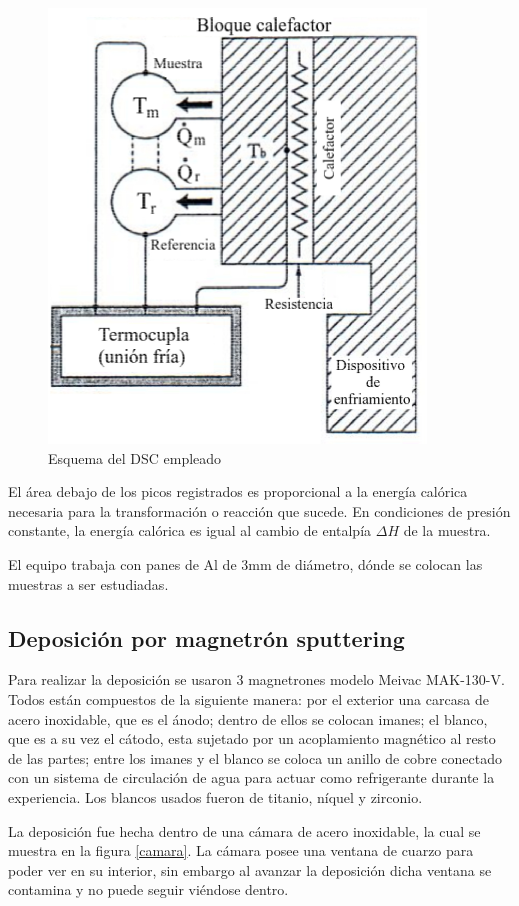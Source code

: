 \documentclass{article}
\theoremstyle{definition}
\theoremstyle{remark}
\begin{document}
\begin{figure}[h]
	\centering
	\includegraphics[scale=0.2]{img/DSCscheme.png}
	\caption{Esquema del DSC empleado}
	\label{DSCscheme}
\end{figure}

El área debajo de los picos registrados es proporcional a la energía calórica necesaria para la transformación o reacción que sucede. En condiciones de presión constante, la energía calórica es igual al cambio de entalpía $\Delta H$ de la muestra.

El equipo trabaja con panes de Al de 3mm de diámetro, dónde se colocan las muestras a ser estudiadas.

\subsection{Deposición por magnetrón sputtering}
Para realizar la deposición se usaron 3 magnetrones modelo Meivac MAK-130-V. Todos están compuestos de la siguiente manera: por el exterior una carcasa de acero inoxidable, que es el ánodo; dentro de ellos se colocan imanes; el blanco, que es a su vez el cátodo, esta sujetado por un acoplamiento magnético al resto de las partes; entre los imanes y el blanco se coloca un anillo de cobre conectado con un sistema de circulación de agua para actuar como refrigerante durante la experiencia. Los blancos usados fueron de titanio, níquel y zirconio.

La deposición fue hecha dentro de una cámara de acero inoxidable, la cual se muestra en la figura \ref{camara}. La cámara posee una ventana de cuarzo para poder ver en su interior, sin embargo al avanzar la deposición dicha ventana se contamina y no puede seguir viéndose dentro.
\end{document}
